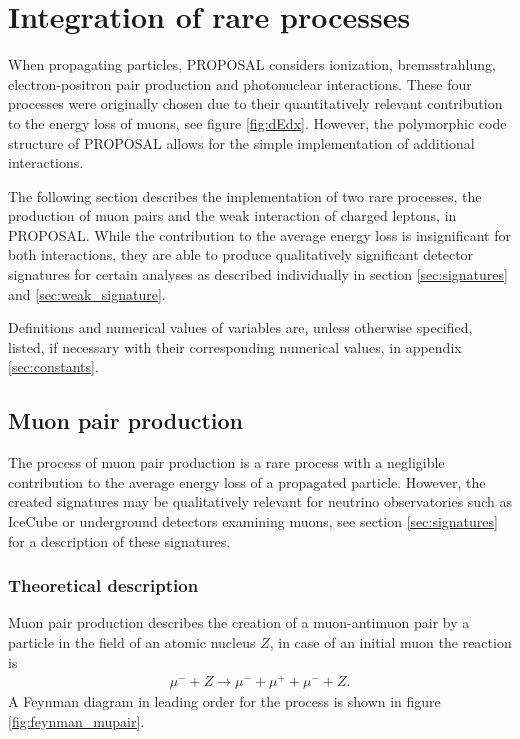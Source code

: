 \chapter{Integration of rare processes}

\label{sec:rare}

When propagating particles, PROPOSAL considers ionization, bremsstrahlung, electron-positron pair production and photonuclear interactions.
These four processes were originally chosen due to their quantitatively relevant contribution to the energy loss of muons, see figure \ref{fig:dEdx}.
However, the polymorphic code structure of PROPOSAL allows for the simple implementation of additional interactions.

The following section describes the implementation of two rare processes, the production of muon pairs and the weak interaction of charged leptons, in PROPOSAL.
While the contribution to the average energy loss is insignificant for both interactions, they are able to produce qualitatively significant detector signatures for certain analyses as described individually in section \ref{sec:signatures} and \ref{sec:weak_signature}. 

Definitions and numerical values of variables are, unless otherwise specified, listed, if necessary with their corresponding numerical values, in appendix \ref{sec:constants}.

\section{Muon pair production}

The process of muon pair production is a rare process with a negligible contribution to the average energy loss of a propagated particle.
However, the created signatures may be qualitatively relevant for neutrino observatories such as IceCube or underground detectors examining muons, see section \ref{sec:signatures} for a description of these signatures.

\subsection{Theoretical description}

Muon pair production describes the creation of a muon-antimuon pair by a particle in the field of an atomic nucleus $Z$, in case of an initial muon the reaction is
\begin{align*}
    \mu^- + Z \rightarrow \mu^- + \mu^+ + \mu^- + Z.
\end{align*}
A Feynman diagram in leading order for the process is shown in figure \ref{fig:feynman_mupair}.

